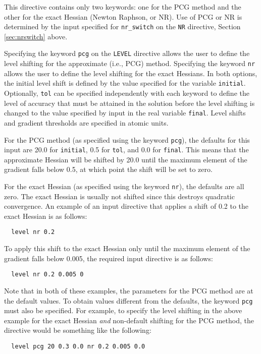 This directive contains only two keywords: one for the PCG method and
the other for the exact Hessian (Newton Raphson, or NR).  Use of PCG
or NR is determined by the input specified for \verb+nr_switch+ on the
\verb+NR+ directive, Section \ref{sec:nrswitch} above.  

Specifying the keyword \verb+pcg+ on the \verb+LEVEL+ directive allows
the user to define the level shifting for the approximate (i.e., PCG)
method.  Specifying the keyword \verb+nr+ allows the user to define
the level shifting for the exact Hessians.  In both options, the
initial level shift is defined by the value specified for the variable
\verb+initial+.  Optionally, \verb+tol+ can be specified independently
with each keyword to define the level of accuracy that must be
attained in the solution before the level shifting is changed to the
value specified by input in the real variable \verb+final+.  Level
shifts and gradient thresholds are specified in atomic units.

For the PCG method (as specified using the keyword \verb+pcg+), the
defaults for this input are 20.0 for \verb+initial+, 0.5 for
\verb+tol+, and 0.0 for \verb+final+.  This means that the
approximate Hessian will be shifted by 20.0 until the maximum element
of the gradient falls below 0.5, at which point the shift will be set
to zero.

For the exact Hessian (as specified using the keyword \verb+nr+), the
defaults are all zero.  The exact Hessian is usually not shifted since
this destroys quadratic convergence.  An example of an input directive
that applies a shift of 0.2 to the exact Hessian is as follows:
\begin{verbatim}
  level nr 0.2
\end{verbatim}

To apply this shift to the exact Hessian only until the maximum
element of the gradient falls below 0.005, the required input
directive is as follows:
\begin{verbatim}
  level nr 0.2 0.005 0
\end{verbatim}

Note that in both of these examples, the parameters for the PCG method
are at the default values.  To obtain values different from the
defaults, the keyword \verb+pcg+ must also be specified.  For example,
to specify the level shifting in the above example for the exact
Hessian {\em and} non-default shifting for the PCG method, the
directive would be something like the following:
\begin{verbatim}
  level pcg 20 0.3 0.0 nr 0.2 0.005 0.0
\end{verbatim}

